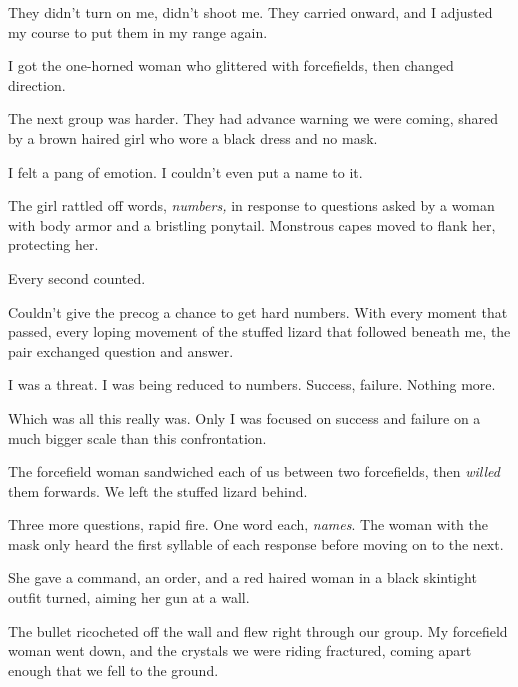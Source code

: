 They didn't turn on me, didn't shoot me.  They carried onward, and I adjusted my course to put them in my range again.



I got the one-horned woman who glittered with forcefields, then changed direction.



The next group was harder.  They had advance warning we were coming, shared by a brown haired girl who wore a black dress and no mask.



I felt a pang of emotion.  I couldn't even put a name to it.



The girl rattled off words, \emph{numbers, }in response to questions asked by a woman with body armor and a bristling ponytail.  Monstrous capes moved to flank her, protecting her.



Every second counted.



Couldn't give the precog a chance to get hard numbers.  With every moment that passed, every loping movement of the stuffed lizard that followed beneath me, the pair exchanged question and answer.



I was a threat.  I was being reduced to numbers.  Success, failure.  Nothing more.



Which was all this really was.  Only I was focused on success and failure on a much bigger scale than this confrontation.



The forcefield woman sandwiched each of us between two forcefields, then \emph{willed} them forwards.  We left the stuffed lizard behind.



Three more questions, rapid fire.  One word each, \emph{names}.  The woman with the mask only heard the first syllable of each response before moving on to the next.



She gave a command, an order, and a red haired woman in a black skintight outfit turned, aiming her gun at a wall.



The bullet ricocheted off the wall and flew right through our group.  My forcefield woman went down, and the crystals we were riding fractured, coming apart enough that we fell to the ground.



